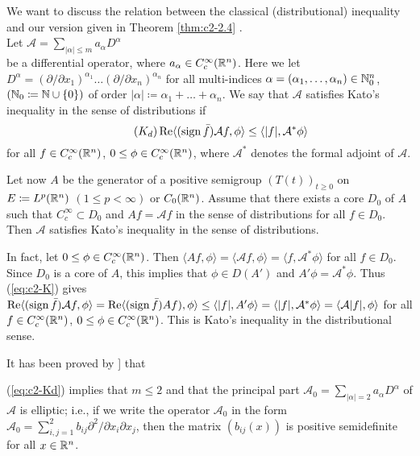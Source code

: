 We want to discuss the relation between the classical (distributional) inequality and our version given in Theorem \ref{thm:c2-2.4}  .\\
Let \qquad \qquad $\mathcal{A} = \sum_{|\alpha| \leq m} a_{\alpha} D^{\alpha}$ \\
be a differential operator, where $a_{\alpha} \in C_{c}^{\infty}(\mathbb{R}^n)$.
Here we let \\
$
D^{\alpha} = (\partial/\partial x_1)^{\alpha_1} \ldots (\partial/\partial x_{n})^{\alpha_{n}}
$ 
for all multi-indices $\alpha = (\alpha_1,\ldots,\alpha_{n}) \in \mathbb{N}_{0}^n$, \\
$(\mathbb{N}_{0} \coloneqq \mathbb{N}\cup\{0\})$ of order $|\alpha| \coloneqq \alpha_1 + \ldots + \alpha_{n}$.
We say that $\mathcal{A}$ satisfies Kato's inequality in the sense of distributions if
\begin{equation}\label{eq:c2-Kd} \tag{$K_{d}$}
\Re\langle(\sign \bar{f})\mathcal{A}f, \phi \rangle \leq \langle|f|, \mathcal{A}^{*}\phi \rangle
\end{equation}
for all $f \in C_{c}^{\infty}(\mathbb{R}^n)$, $0 \leq \phi \in C_{c}^{\infty}(\mathbb{R}^n)$, where $\mathcal{A}^{*}$ denotes the formal adjoint of $\mathcal{A}$.

Let now $A$ be the generator of a positive semigroup $(T(t))_{t \geq 0}$ on $E \coloneqq L^p(\mathbb{R}^n)$ $(1 \leq p < \infty)$ or $C_{0}(\mathbb{R}^n)$.
Assume that there exists a core
$D_{0}$ of $A$ such that $C_{c}^{\infty} \subset D_{0}$ and $Af = \mathcal{A}f$ in the sense of distributions for all $f \in D_{0}$.
Then $\mathcal{A}$ satisfies Kato's inequality in the sense of distributions.

In fact, let $0 \leq \phi \in C_{c}^{\infty}(\mathbb{R}^n)$.
Then $\langle Af,\phi \rangle = \langle \mathcal{A}f,\phi \rangle = \langle f,\mathcal{A}^{*}\phi \rangle$ for all $f \in D_{0}$.
Since $D_{0}$ is a core of $A$, this implies that $\phi \in D(A')$ and $A'\phi = \mathcal{A}^{*}\phi$.
Thus (\ref{eq:c2-K})   gives $\mathop{}\!\mathrm{Re}\langle(\operatorname{sign} \bar{f})\mathcal{A}f,\phi \rangle = \mathop{}\!\mathrm{Re}\langle(\operatorname{sign} \bar{f})Af),\phi \rangle \leq \langle |f|,A'\phi \rangle = \langle |f|,\mathcal{A}^{*}\phi \rangle = \langle \mathcal{A}|f|,\phi \rangle$ for all $f \in C_{c}^{\infty}(\mathbb{R}^n)$, $0 \leq \phi \in C_{c}^{\infty}(\mathbb{R}^n)$.
This is Kato's inequality in the distributional sense.

\begin{remark*}\label{rem:c2-3.0}
It has been proved by \citet{miyajimaokazawa:1984}] that 

 (\ref{eq:c2-Kd}) implies that $m \leq 2$ and that the principal part $\mathcal{A}_{0} = \sum_{|\alpha|=2} a_{\alpha} D^{\alpha}$ of $\mathcal{A}$ is elliptic; i.e., if we write the operator $\mathcal{A}_{0}$ in the form $\mathcal{A}_{0} = \sum_{i,j=1}^{2} b_{ij} \partial^{2}/\partial x_{i} \partial x_{j}$, then the matrix $(b_{ij}(x))$ is positive semidefinite for all $x \in \mathbb{R}^n$.
\end{remark*}

